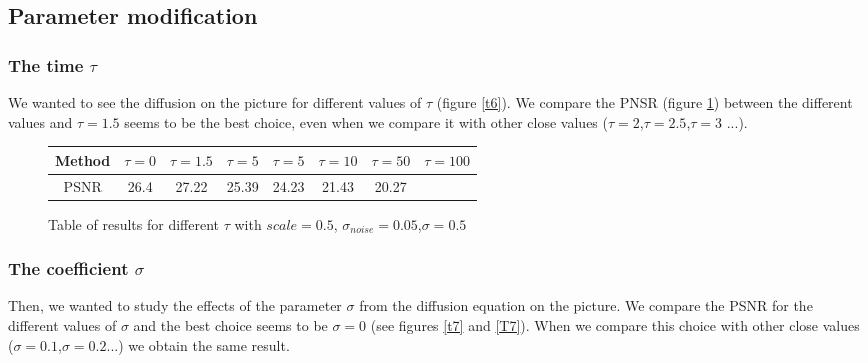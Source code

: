 \documentclass{report}
\begin{document}
\subsection{Parameter modification}
\subsubsection{The time $\tau$}


We wanted to see the diffusion on the picture for different values of $\tau$ (figure \ref{t6}). We compare the PNSR (figure \ref{T6}) between the different values and $\tau=1.5$ seems to be the best choice, even when we compare it with other close values ($\tau=2$,$\tau=2.5$,$\tau=3$ ...). \\ 








        \begin{figure}[h!]
        \label{T6}
        \centering
         \caption{Table of results for different $\tau$ with $scale=0.5$, $\sigma_{noise}=0.05$,$\sigma=0.5$ }
        \begin{tabular}{|c|c|c|c|c|c|c|c|}
        \hline
        Method & $\tau=0$ & $\tau=1.5$ & $\tau=5$ & $\tau=5$ & $\tau=10$ & $\tau=50$ & $\tau=100$
        \\ \hline
         PSNR  & 26.4 & 27.22 & 25.39 & 24.23 & 21.43 & 20.27 \\
         \hline
        \end{tabular}
        \end{figure}






\subsubsection{The coefficient $\sigma$}

Then, we wanted to study the effects of the parameter $\sigma$ from the diffusion equation on the picture. We compare the PSNR for the different values of $\sigma$ and the best choice seems to be $\sigma=0$ (see figures \ref{t7} and \ref{T7}). When we compare this choice with other close values ($\sigma=0.1$,$\sigma=0.2$...) we obtain the same result. 


       
\end{document}
